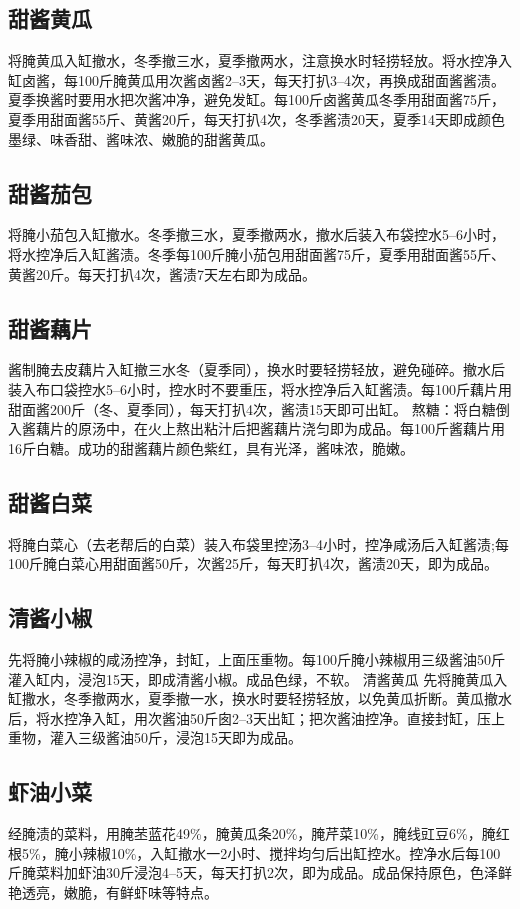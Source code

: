 \documentclass{ctexbook}
\begin{document}
\subsection{甜酱黄瓜}
将腌黄瓜入缸撤水，冬季撤三水，夏季撤两水，注意换水时轻捞轻放。将水控净入缸卤酱，每100斤腌黄瓜用次酱卤酱2--3天，每天打扒3--4次，再换成甜面酱酱渍。夏季换酱时要用水把次酱冲净，避免发缸。每100斤卤酱黄瓜冬季用甜面酱75斤，夏季用甜面酱55斤、黄酱20斤，每天打扒4次，冬季酱渍20天，夏季14天即成颜色墨绿、味香甜、酱味浓、嫩脆的甜酱黄瓜。


\subsection{甜酱茄包}
将腌小茄包入缸撤水。冬季撤三水，夏季撤两水，撤水后装入布袋控水5--6小时，将水控净后入缸酱渍。冬季每100斤腌小茄包用甜面酱75斤，夏季用甜面酱55斤、黄酱20斤。每天打扒4次，酱渍7天左右即为成品。
\subsection{甜酱藕片}
酱制腌去皮藕片入缸撤三水冬（夏季同），换水时要轻捞轻放，避免碰碎。撤水后装入布口袋控水5--6小时，控水时不要重压，将水控净后入缸酱渍。每100斤藕片用甜面酱200斤（冬、夏季同），每天打扒4次，酱渍15天即可出缸。
熬糖：将白糖倒入酱藕片的原汤中，在火上熬出粘汁后把酱藕片浇匀即为成品。每100斤酱藕片用16斤白糖。成功的甜酱藕片颜色紫红，具有光泽，酱味浓，脆嫩。
\subsection{甜酱白菜}
将腌白菜心（去老帮后的白菜）装入布袋里控汤3--4小时，控净咸汤后入缸酱渍;每100斤腌白菜心用甜面酱50斤，次酱25斤，每天盯扒4次，酱渍20天，即为成品。
\subsection{清酱小椒}
先将腌小辣椒的咸汤控净，封缸，上面压重物。每100斤腌小辣椒用三级酱油50斤灌入缸内，浸泡15天，即成清酱小椒。成品色绿，不软。
清酱黄瓜
先将腌黄瓜入缸撒水，冬季撤两水，夏季撤一水，换水时要轻捞轻放，以免黄瓜折断。黄瓜撤水后，将水控净入缸，用次酱油50斤囱2--3天出缸；把次酱油控净。直接封缸，压上重物，灌入三级酱油50斤，浸泡15天即为成品。
\subsection{虾油小菜}
经腌渍的菜料，用腌苤蓝花49\%，腌黄瓜条20\%，腌芹菜10\%，腌线豇豆6\%，腌红根5\%，腌小辣椒10\%，入缸撤水一2小时、搅拌均匀后出缸控水。控净水后每100斤腌菜料加虾油30斤浸泡4--5天，每天打扒2次，即为成品。成品保持原色，色泽鲜艳透亮，嫩脆，有鲜虾味等特点。
\end{document}
